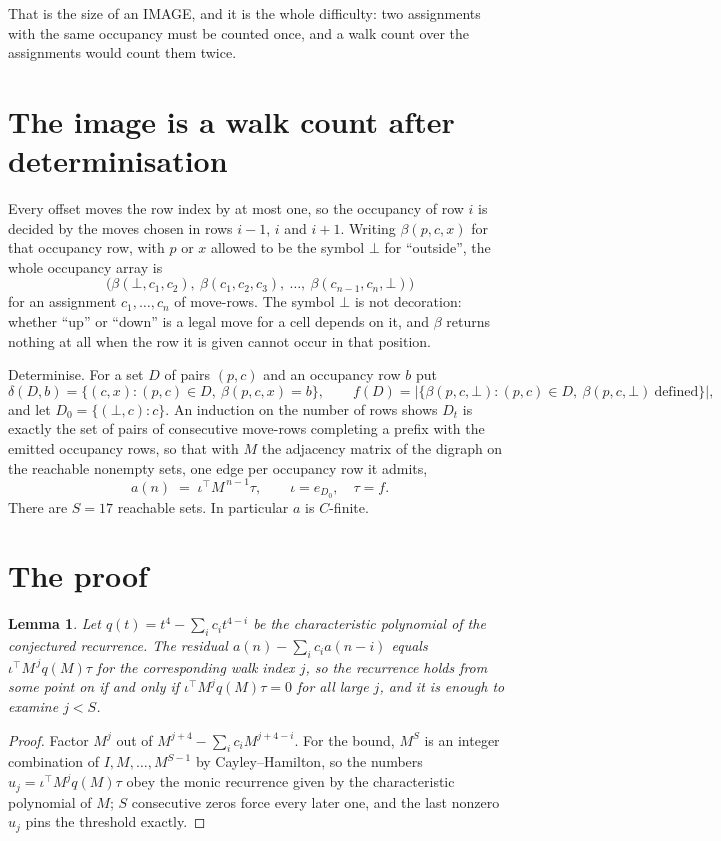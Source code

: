 \documentclass[11pt,a4paper]{article}
\theoremstyle{plain}
\newtheorem{lemma}[theorem]{Lemma}
\theoremstyle{definition}
\begin{document}
That is the size of an IMAGE, and it is the whole difficulty: two assignments with the same
occupancy must be counted once, and a walk count over the assignments would count them twice.

\section{The image is a walk count after determinisation}

Every offset moves the row index by at most one, so the occupancy of row $i$ is decided by the
moves chosen in rows $i-1$, $i$ and $i+1$. Writing $\beta(p,c,x)$ for that occupancy row, with
$p$ or $x$ allowed to be the symbol $\bot$ for ``outside'', the whole occupancy array is
\[
\bigl(\beta(\bot,c_1,c_2),\ \beta(c_1,c_2,c_3),\ \dots,\ \beta(c_{n-1},c_n,\bot)\bigr)
\]
for an assignment $c_1,\dots,c_n$ of move-rows. The symbol $\bot$ is not decoration: whether
``up'' or ``down'' is a legal move for a cell depends on it, and $\beta$ returns nothing at all
when the row it is given cannot occur in that position.

Determinise. For a set $D$ of pairs $(p,c)$ and an occupancy row $b$ put
\[
\delta(D,b)=\{(c,x):(p,c)\in D,\ \beta(p,c,x)=b\},\qquad
f(D)=\bigl|\{\beta(p,c,\bot):(p,c)\in D,\ \beta(p,c,\bot)\ \text{defined}\}\bigr| ,
\]
and let $D_0=\{(\bot,c):c\}$. An induction on the number of rows shows $D_t$ is exactly the
set of pairs of consecutive move-rows completing a prefix with the emitted occupancy rows, so
that with $M$ the adjacency matrix of the digraph on the reachable nonempty sets, one edge per
occupancy row it admits,
\[
a(n)\;=\;\iota^{\!\top}M^{\,n-1}\tau,\qquad \iota=e_{D_0},\quad \tau=f .
\]
There are $S=17$ reachable sets. In particular $a$ is $C$-finite.

\section{The proof}

\begin{lemma}\label{lem:crit}
Let $q(t)=t^{4}-\sum_i c_it^{4-i}$ be the characteristic polynomial of the
conjectured recurrence. The residual $a(n)-\sum_ic_ia(n-i)$ equals
$\iota^{\!\top}M^{\,j}q(M)\tau$ for the corresponding walk index $j$, so the recurrence
holds from some point on if and only if $\iota^{\!\top}M^{j}q(M)\tau=0$ for all large $j$,
and it is enough to examine $j<S$.
\end{lemma}

\begin{proof}
Factor $M^{j}$ out of $M^{j+4}-\sum_ic_iM^{j+4-i}$. For the bound, $M^{S}$
is an integer combination of $I,M,\dots,M^{S-1}$ by Cayley--Hamilton, so the numbers
$u_j=\iota^{\!\top}M^{j}q(M)\tau$ obey the monic recurrence given by the characteristic
polynomial of $M$; $S$ consecutive zeros force every later one, and the last nonzero $u_j$
pins the threshold exactly.
\end{proof}
\end{document}
